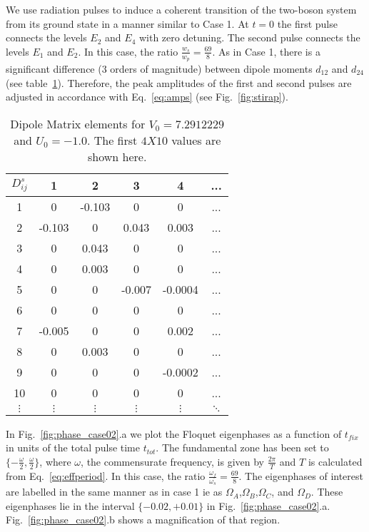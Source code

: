 \documentclass{article}
\begin{document}
We use radiation pulses to  induce a coherent transition of the two-boson system from its ground state in a manner similar to Case 1.  At $t=0$ the first pulse connects the levels $E_2$ and $E_4$ with zero detuning. The second pulse connects the  levels $E_1$ and $E_2$.  In this case, the ratio $\frac{w_s}{w_p}=\frac{69}{8}$. As in Case 1, there is a significant difference ($3$ orders of magnitude) between dipole moments $d_{12}$ and $d_{24}$ (see table~\ref{tabB}). Therefore, the peak amplitudes of the first and second pulses are adjusted in accordance with Eq.~\eqref{eq:amps} (see Fig.~\ref{fig:stirap}).
%
%
\begin{table}
\begin{center}
\begin{tabular}{|c|ccccc}
$D^s_{ij}$ & 1& 2& 3& 4& ...\\
\hline
1& 0&-0.103& 0& 0& ...\\
2&-0.103 & 0&0.043 &0.003 &  ...\\
3& 0&0.043 & 0& 0&... \\
4& 0&0.003 & 0& 0&   ... \\
5& 0& 0&-0.007 &-0.0004 &   ... \\
6& 0& 0& 0& 0&   ... \\
7&-0.005 & 0& 0&0.002 &  ... \\
8& 0&0.003 & 0& 0&   ...\\
9& 0& 0& 0&-0.0002 & ... \\
10& 0& 0& 0& 0&   ... \\
$\vdots$& $\vdots$& $\vdots$& $\vdots$& $\vdots$& $\ddots$\\
\end{tabular}
\caption{Dipole Matrix elements for $V_0=7.2912229$ and $U_0=-1.0$. The first $4 X 10$ values are shown here. }
\label{tabB}
\end{center}
\end{table}
%
%
In Fig.~\ref{fig:phase_case02}.a we plot the Floquet eigenphases as a function of $t_{fix}$  in units of the total pulse time $t_{tot}$. The fundamental zone  has been set to $\lbrace - \frac{\omega}{2},\frac{\omega}{2}\rbrace $, where $\omega$, the commensurate frequency, is given by $\frac{2\pi}{T}$ and $T$ is calculated from Eq.~\eqref{eq:effperiod}.  In this case, the ratio $\frac{\omega_f}{\omega_s}=\frac{69}{8}$. The eigenphases of interest are  labelled in the same manner as in case 1 ie as $\Omega_A$,$\Omega_B$,$\Omega_C$, and $\Omega_D$. These eigenphases lie in the interval $\lbrace -0.02, +0.01 \rbrace$ in Fig.~\ref{fig:phase_case02}.a.  Fig.~\ref{fig:phase_case02}.b  shows a magnification of that region. 
\end{document}
